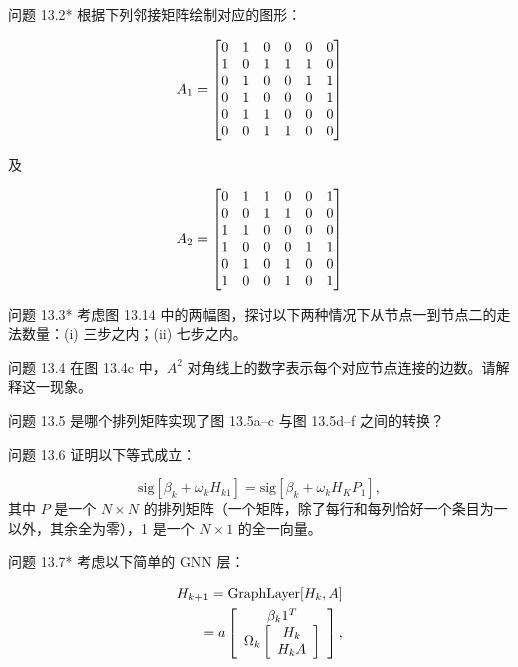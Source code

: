 \documentclass[lang=cn,newtx,10pt,scheme=chinese]{elegantbook}
\begin{document}
问题 13.2* 根据下列邻接矩阵绘制对应的图形：

\begin{equation}
A_1 =
\begin{bmatrix}
0 & 1 & 0 & 0 & 0 & 0 \\
1 & 0 & 1 & 1 & 1 & 0 \\
0 & 1 & 0 & 0 & 1 & 1 \\
0 & 1 & 0 & 0 & 0 & 1 \\
0 & 1 & 1 & 0 & 0 & 0 \\
0 & 0 & 1 & 1 & 0 & 0  \notag \\
\end{bmatrix}
\end{equation}

及

\begin{equation}
A_2 =
\begin{bmatrix}
0 & 1 & 1 & 0 & 0 & 1 \\
0 & 0 & 1 & 1 & 0 & 0 \\
1 & 1 & 0 & 0 & 0 & 0 \\
1 & 0 & 0 & 0 & 1 & 1 \\
0 & 1 & 0 & 1 & 0 & 0 \\
1 & 0 & 0 & 1 & 0 & 1 \notag \\
\end{bmatrix}
\end{equation}

问题 13.3* 考虑图 13.14 中的两幅图，探讨以下两种情况下从节点一到节点二的走法数量：(i) 三步之内；(ii) 七步之内。

问题 13.4 在图 13.4c 中，\(A^2\) 对角线上的数字表示每个对应节点连接的边数。请解释这一现象。

问题 13.5 是哪个排列矩阵实现了图 13.5a–c 与图 13.5d–f 之间的转换？

问题 13.6 证明以下等式成立：

\begin{equation}
\text{sig}[\beta_k + \omega_k H_{k1}] = \text{sig}[\beta_k + \omega_k H_K P_{1}], 
\end{equation}
其中 \(P\) 是一个 \(N \times N\) 的排列矩阵（一个矩阵，除了每行和每列恰好一个条目为一以外，其余全为零），1 是一个 \(N \times 1\) 的全一向量。

问题 13.7* 考虑以下简单的 GNN 层：


\begin{align}
H_{k+1} = \text{GraphLayer}[H_k, A] \notag \\
= a \left[
\begin{array}{c}
\beta_k 1^T  \\
\Omega_k \left[ \begin{array}{c}
H_k  \\
H_k A \\
\end{array} \right]
\end{array}
\right], 
\end{align} 
\end{document}
